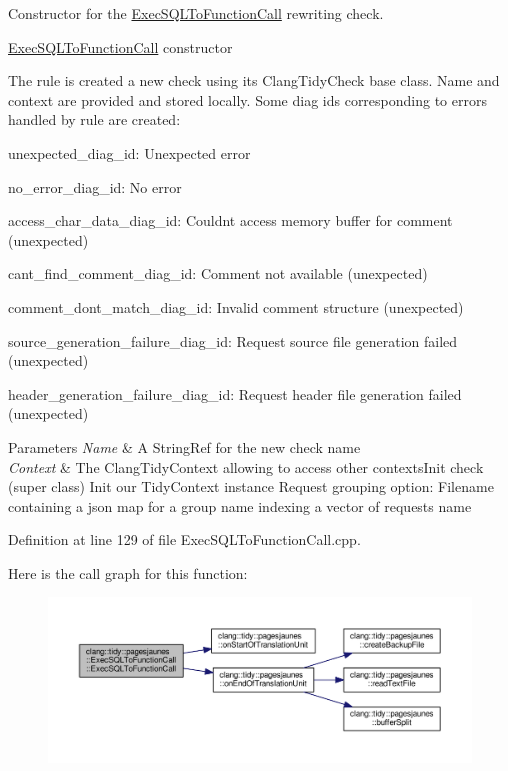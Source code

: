 Constructor for the \hyperlink{classclang_1_1tidy_1_1pagesjaunes_1_1_exec_s_q_l_to_function_call}{Exec\+S\+Q\+L\+To\+Function\+Call} rewriting check. 

\hyperlink{classclang_1_1tidy_1_1pagesjaunes_1_1_exec_s_q_l_to_function_call}{Exec\+S\+Q\+L\+To\+Function\+Call} constructor

The rule is created a new check using its {\ttfamily Clang\+Tidy\+Check} base class. Name and context are provided and stored locally. Some diag ids corresponding to errors handled by rule are created\+:
\begin{DoxyItemize}
\item unexpected\+\_\+diag\+\_\+id\+: Unexpected error
\item no\+\_\+error\+\_\+diag\+\_\+id\+: No error
\item access\+\_\+char\+\_\+data\+\_\+diag\+\_\+id\+: Couldn\textquotesingle{}t access memory buffer for comment (unexpected)
\item cant\+\_\+find\+\_\+comment\+\_\+diag\+\_\+id\+: Comment not available (unexpected)
\item comment\+\_\+dont\+\_\+match\+\_\+diag\+\_\+id\+: Invalid comment structure (unexpected)
\item source\+\_\+generation\+\_\+failure\+\_\+diag\+\_\+id\+: Request source file generation failed (unexpected)
\item header\+\_\+generation\+\_\+failure\+\_\+diag\+\_\+id\+: Request header file generation failed (unexpected)
\end{DoxyItemize}


\begin{DoxyParams}{Parameters}
{\em Name} & A String\+Ref for the new check name \\
\hline
{\em Context} & The Clang\+Tidy\+Context allowing to access other contexts\+Init check (super class) Init our Tidy\+Context instance Request grouping option\+: Filename containing a json map for a group name indexing a vector of requests name \\
\hline
\end{DoxyParams}


Definition at line 129 of file Exec\+S\+Q\+L\+To\+Function\+Call.\+cpp.

Here is the call graph for this function\+:
\nopagebreak
\begin{figure}[H]
\begin{center}
\leavevmode
\includegraphics[width=350pt]{classclang_1_1tidy_1_1pagesjaunes_1_1_exec_s_q_l_to_function_call_a75d4780b9a48eb91ed92fdde28a7214d_cgraph}
\end{center}
\end{figure}


